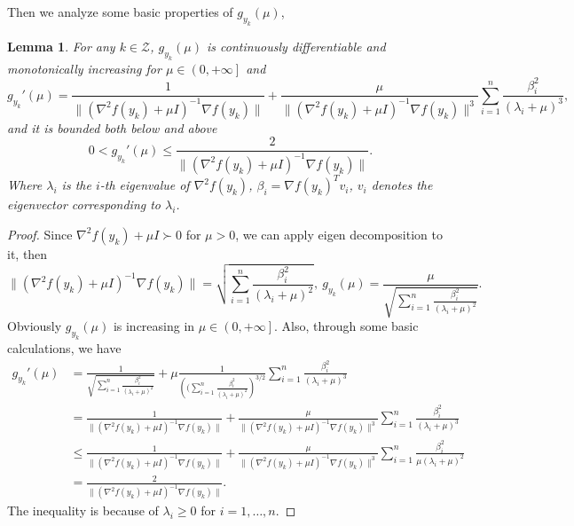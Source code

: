 \documentclass{article}
\theoremstyle{plain}
\newtheorem{lemma}[theorem]{Lemma}
\theoremstyle{definition}
\theoremstyle{remark}
\begin{document}
Then we analyze some basic properties of $g_{y_k}(\mu)$,
\begin{lemma}
    \label{lem.property g appendix}
    For any $k\in\mathcal{Z}$, $g_{y_k}(\mu)$ is continuously differentiable and monotonically increasing for $\mu \in \left (0,+\infty\right ]$ and
    \begin{equation}
        \label{eq.derivative}
        g_{y_k}'(\mu) = \frac{1}{\|\left (\nabla ^2 f(y_k)+\mu I \right)^{-1}\nabla f(y_k)\|}+\frac{\mu}{\|\left (\nabla ^2 f(y_k)+\mu I \right)^{-1}\nabla f(y_k)\|^3}\sum_{i=1}^n\frac{\beta_i^2}{\left (\lambda_i+\mu\right )^3},
    \end{equation}
    and it is bounded both below and above
    \begin{equation}
        \label{eq.derivative bound}
        0< g_{y_k}'(\mu) \leq \frac{2}{\|\left (\nabla ^2 f(y_k)+\mu I \right)^{-1}\nabla f(y_k)\|}.
    \end{equation}
    Where $\lambda_i$ is the $i$-th eigenvalue of $\nabla ^2 f(y_k)$, $\beta_i = \nabla f(y_k)^T v_i$, $v_i$ denotes the eigenvector corresponding to $\lambda_i$.
\end{lemma}
\begin{proof}
    Since $\nabla^2 f(y_k)+\mu I \succ 0$ for $\mu>0$, we can apply eigen decomposition to it, then
    \begin{equation*}
        \|\left (\nabla ^2 f(y_k)+\mu I \right)^{-1}\nabla f(y_k)\|=\sqrt{\sum_{i=1}^n \frac{\beta_i^2}{\left (\lambda_i+\mu\right )^2}}, \ g_{y_k}(\mu) = \frac{\mu}{\sqrt{\sum_{i=1}^n \frac{\beta_i^2}{\left (\lambda_i+\mu\right )^2}}}.
    \end{equation*}
    Obviously $g_{y_k}(\mu)$ is increasing in $\mu \in \left (0,+\infty\right ]$. Also, through some basic calculations, we have
    \begin{equation*}
        \begin{aligned}
            g_{y_k}'(\mu) & = \frac{1}{\sqrt{\sum_{i=1}^n \frac{\beta_i^2}{\left (\lambda_i+\mu\right )^2}}}+\mu \frac{1}{\left ( (\sum_{i=1}^n \frac{\beta_i^2}{\left (\lambda_i+\mu\right )^2}\right )^{3/2}}\sum_{i=1}^n\frac{\beta_i^2}{\left (\lambda_i+\mu\right )^3} \\
                          & = \frac{1}{\|\left (\nabla ^2 f(y_k)+\mu I \right)^{-1}\nabla f(y_k)\|}+\frac{\mu}{\|\left (\nabla ^2 f(y_k)+\mu I \right)^{-1}\nabla f(y_k)\|^3}\sum_{i=1}^n\frac{\beta_i^2}{\left (\lambda_i+\mu\right )^3}                                   \\
                          & \leq \frac{1}{\|\left (\nabla ^2 f(y_k)+\mu I \right)^{-1}\nabla f(y_k)\|}+\frac{\mu}{\|\left (\nabla ^2 f(y_k)+\mu I \right)^{-1}\nabla f(y_k)\|^3}\sum_{i=1}^n\frac{\beta_i^2}{\mu\left (\lambda_i+\mu\right )^2}                             \\
                          & =  \frac{2}{\|\left (\nabla ^2 f(y_k)+\mu I \right)^{-1}\nabla f(y_k)\|}.
        \end{aligned}
    \end{equation*}
    The inequality is because of $\lambda_i \geq 0$ for $i=1,\ldots,n$.
\end{proof}
\end{document}

